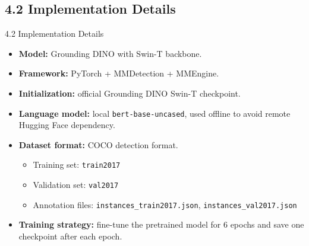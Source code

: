 \documentclass[aspectratio=169,10pt]{beamer}
\begin{document}
\subsection{4.2 Implementation Details}

\begin{frame}{4.2 Implementation Details}
\small
\begin{itemize}
    \item \textbf{Model:} Grounding DINO with Swin-T backbone.
    \item \textbf{Framework:} PyTorch + MMDetection + MMEngine.
    \item \textbf{Initialization:} official Grounding DINO Swin-T checkpoint.
    \item \textbf{Language model:} local \texttt{bert-base-uncased}, used offline to avoid remote Hugging Face dependency.
    \item \textbf{Dataset format:} COCO detection format.
    \begin{itemize}
        \item Training set: \texttt{train2017}
        \item Validation set: \texttt{val2017}
        \item Annotation files: \texttt{instances\_train2017.json}, \texttt{instances\_val2017.json}
    \end{itemize}
    \item \textbf{Training strategy:} fine-tune the pretrained model for 6 epochs and save one checkpoint after each epoch.
\end{itemize}
\end{frame}
\end{document}
